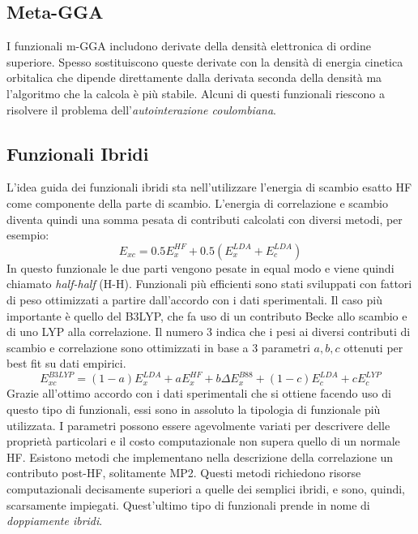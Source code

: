 \documentclass[oneside]{amsbook}
\numberwithin{section}{chapter}
\numberwithin{equation}{section}
\numberwithin{figure}{section}
\begin{document}
\subsection{Meta-GGA }
I funzionali m-GGA includono derivate della densità elettronica di ordine superiore. Spesso sostituiscono queste derivate con la densità di energia cinetica orbitalica che dipende direttamente dalla derivata seconda della densità ma l'algoritmo che la calcola è più stabile.
Alcuni di questi funzionali riescono a risolvere il problema dell'\emph{autointerazione coulombiana}.
\subsection{Funzionali Ibridi }
L'idea guida dei funzionali ibridi sta nell'utilizzare l'energia di scambio esatto HF come componente della parte di scambio.
L'energia di correlazione e scambio diventa quindi una somma pesata di contributi calcolati con diversi metodi, per esempio:
\begin{equation}
E_{xc}=0.5E_x^{HF}+0.5(E_x^{LDA}+E_c^{LDA})
\end{equation}
In questo funzionale le due parti vengono pesate in equal modo e viene quindi chiamato \emph{half-half} (H-H). Funzionali più efficienti sono stati sviluppati con fattori di peso ottimizzati a partire dall'accordo con i dati sperimentali. Il caso più importante è quello del B3LYP, che fa uso di un contributo Becke allo scambio e di uno LYP alla correlazione. Il numero $3$ indica che i pesi ai diversi contributi di scambio e correlazione sono ottimizzati in base a $3$ parametri $a,b,c$ ottenuti per best fit su dati empirici.
\begin{equation}
E_{xc}^{B3LYP}=(1-a)E_x^{LDA}+aE_x^{HF}+b\Delta E_x^{B88}+(1-c)E_c^{LDA}+cE_c^{LYP}
\end{equation}
Grazie all'ottimo accordo con i dati sperimentali che si ottiene facendo uso di questo tipo di funzionali, essi sono in assoluto la tipologia di funzionale più utilizzata. I parametri possono essere agevolmente variati per descrivere delle proprietà particolari e il costo computazionale non supera quello di un normale HF.
Esistono metodi che implementano nella descrizione della correlazione un contributo post-HF, solitamente MP2. Questi metodi richiedono risorse computazionali decisamente superiori a quelle dei semplici ibridi, e sono, quindi, scarsamente impiegati. Quest'ultimo tipo di funzionali prende in nome di \emph{doppiamente ibridi}.
\end{document}
